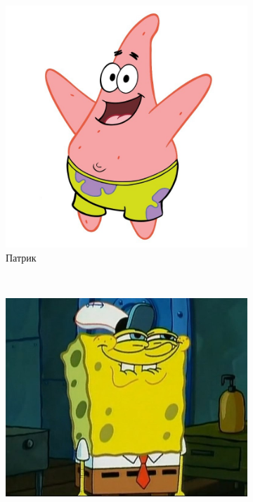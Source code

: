 \documentclass{report}
\begin{document}
\begin{figure}
    \centering
    \begin{subfigure}[b]{0.3\textwidth}
        \includegraphics[width=\textwidth]{patric.jpg}
        \caption{Патрик}
        \label{fig:gull}
    \end{subfigure}
    ~ %
    \begin{subfigure}[b]{0.3\textwidth}
        \includegraphics[width=\textwidth]{spanch_bob.jpeg}

\end{subfigure}
\end{figure}
\end{document}
